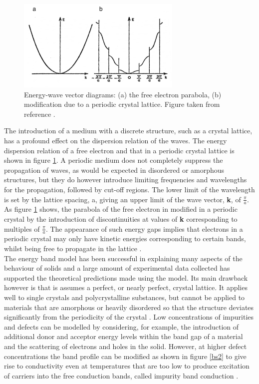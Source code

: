 \begin{figure}[h!]
  \centering
    \includegraphics[width=0.7\textwidth]{figures/bs1.png}
    \caption{Energy-wave vector diagrams: (a) the free electron parabola, (b) modification due to a periodic crystal lattice. Figure taken from reference .}
  \label{bs1}
\end{figure}

The introduction of a medium with a discrete structure, such as a crystal lattice, has a profound effect on the dispersion relation of the waves. The energy dispersion relation of a free electron and that in a periodic crystal lattice is shown in figure \ref{bs1}. A periodic medium does not completely suppress the propagation of waves, as would be expected  in disordered or amorphous structures, but they do however introduce limiting frequencies and wavelengths for the propagation, followed by cut-off regions. The lower limit of the wavelength is set by the lattice spacing, a, giving an upper limit of the wave vector, \textbf{k}, of $\frac{\pi}{a}$. As figure \ref{bs1} shows, the parabola of the free electron in modified in a periodic crystal by the introduction of discontinuities at values of \textbf{k} corresponding to multiples of $\frac{\pi}{a}$. The appearance of such energy gaps implies that electrons in a periodic crystal may only have kinetic energies corresponding to certain bands, whilst being free to propagate in the lattice \cite{small_semiconductor2}.\\

The energy band model has been successful in explaining many aspects of the behaviour of solids and a large amount of experimental data collected has supported the theoretical predictions made using the model. Its main drawback however is that is assumes a perfect, or nearly perfect, crystal lattice. It applies well to single crystals and polycrystalline substances, but cannot be applied to materials that are amorphous or heavily disordered so that the structure deviates significantly from the periodicity of the crystal \cite{small_semiconductor1}. Low concentrations of impurities and defects can be modelled by considering, for example, the introduction of additional donor and acceptor energy levels within the band gap of a material and the scattering of electrons and holes in the solid. However, at higher defect concentrations the band profile can be modified as shown in figure \ref{bs2} to give rise to conductivity even at temperatures that are too low to produce excitation of carriers into the free conduction bands, called impurity band conduction \cite{small_semiconductor2}.\\

